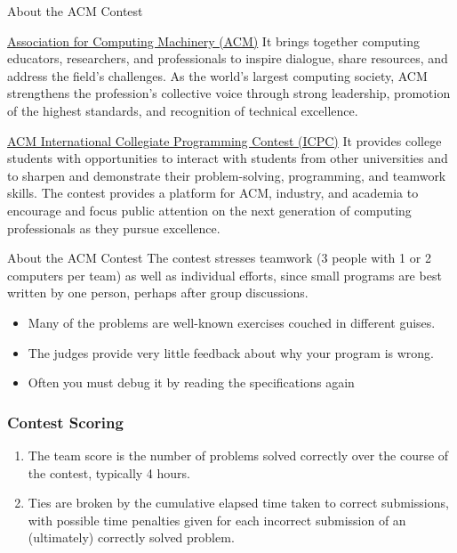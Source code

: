 \documentclass{beamer}
\begin{document}
\begin{frame}{About the ACM Contest}

  \begin{block}{\href{https://www.acm.org/}{Association for Computing Machinery (ACM)}}
    It brings together computing educators, researchers, and professionals to inspire dialogue, share resources, and address the field's challenges. As the world’s largest computing society, ACM strengthens the profession's collective voice through strong leadership, promotion of the highest standards, and recognition of technical excellence. 
  \end{block}

  \begin{block}{\href{https://icpc.baylor.edu/}{ACM International Collegiate Programming Contest (ICPC)}}
    It provides college students with opportunities to interact with students from other universities and to sharpen and demonstrate their problem-solving, programming, and teamwork skills. 
   The contest provides a platform for ACM, industry, and academia to encourage and focus public attention on the next generation of computing professionals as they pursue excellence.
 \end{block}
\end{frame}


\begin{frame}{About the ACM Contest}
  The contest stresses teamwork (3 people with 1 or 2 computers per team) as well as individual efforts, since small programs are best written by one person, perhaps after group discussions.
  
  \begin{itemize}
  \item Many of the problems are well-known exercises couched in different guises.
  \item The  judges  provide  very  little  feedback  about  why  your program is wrong.
  \item Often you must debug it by reading the specifications again
  \end{itemize}
  
\end{frame}

\begin{frame}
  \frametitle{Contest Scoring}

  \begin{enumerate}
  \item \alert{The team score is the number of problems solved correctly} over the course of the contest, typically 4 hours.
  \item Ties are broken by the cumulative elapsed time taken to correct submissions, with possible time penalties given for each incorrect submission of an (ultimately) correctly solved problem.
  \end{enumerate}

\end{frame}
\end{document}
